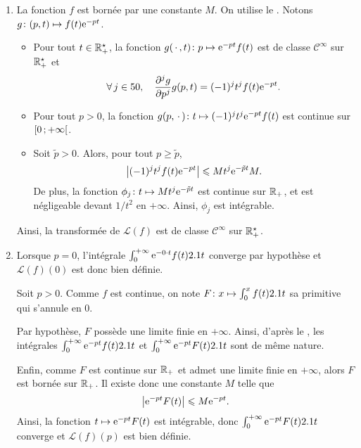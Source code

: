 \begin{demo}
\begin{enumerate}
\item La fonction $f$ est bornée par une constante $M$. On utilise le . Notons $\fonctionligne[g]{(p, t)}{f(t) \e^{-pt}}$.
\begin{itemize}
\item Pour tout $t \in \Rpe$, la fonction $\fonctionligne[g(\,\cdot\,, t)]{p}{\e^{-p t} f(t)}$ est de classe $\mathscr{C}^\infty$ sur $\Rpe$ et
\[
\forall j \in \N,\quad \frac{\partial^j g}{\partial p^j} g(p, t) = (-1)^j t^j f(t) \e^{-pt}.
\]

\item Pour tout $p > 0$, la fonction $\fonctionligne[g(p,\,\cdot\,)]{t}{(-1)^j t^j \e^{-p t} f(t)}$ est continue sur $\interfo{0}{+\infty}$.

\item Soit $\tilde{p} > 0$. Alors, pour tout $p \geqslant \tilde{p}$,
\[
\abs{(-1)^j t^j f(t) \e^{-p t}} \leqslant M t^j \e^{- \tilde{p} t} M.
\]
De plus, la fonction $\fonctionligne[\phi_j]{t}{M t^j \e^{-\tilde{p} t}}$ est continue sur $\Rp$, et est négligeable devant $1/t^2$ en $+\infty$. Ainsi, $\phi_j$ est intégrable.
\end{itemize}
Ainsi, la transformée de  $\mathscr{L}(f)$ est de classe $\mathscr{C}^\infty$ sur $\Rpe$.

\item Lorsque $p = 0$, l'intégrale $\int_0^{+\infty} \e^{-0\cdot t} f(t) \d t$ converge par hypothèse et $\mathscr{L}(f)(0)$ est donc bien définie.

\medskip

Soit $p > 0$. Comme $f$ est continue, on note $\fonctionligne[F]{x}{\int_0^x f(t) \d t}$ sa primitive qui s'annule en $0$.

Par hypothèse, $F$ possède une limite finie en $+\infty$. Ainsi, d'après le , les intégrales $\int_0^{+\infty} \e^{-p t} f(t) \d t$ et $\int_0^{+\infty} \e^{-p t} F(t) \d t$ sont de même nature.

Enfin, comme $F$ est continue sur $\Rp$ et admet une limite finie en $+\infty$, alors $F$ est bornée sur $\Rp$. Il existe donc une constante $M$ telle que
\[
\module{\e^{-p t} F(t)} \leqslant M \e^{-p t}.
\]
Ainsi, la fonction $t \mapsto \e^{-p t} F(t)$ est intégrable, donc $\int_0^{+\infty} \e^{-p t} F(t) \d t$ converge et $\mathscr{L}(f)(p)$ est bien définie.


\end{enumerate}
\end{demo}
